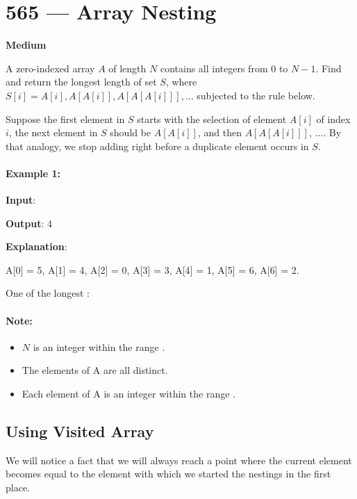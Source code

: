 \section{565 --- Array Nesting}

\textbf{Medium}

A zero-indexed array $A$ of length $N$ contains all integers from 0 to $N-1$. Find and return the longest length of set $S$, where $S[i] = {A[i], A[A[i]], A[A[A[i]]], \ldots }$ subjected to the rule below.

Suppose the first element in $S$ starts with the selection of element $A[i]$ of index $i$, the next element in $S$ should be $A[A[i]]$, and then $A[A[A[i]]]$, $\ldots$. By that analogy, we stop adding right before a duplicate element occurs in $S$.

 

\paragraph{Example 1:}

\begin{flushleft}
\textbf{Input}: 

\textbf{Output}: 4

\textbf{Explanation}: 

A[0] = 5, A[1] = 4, A[2] = 0, A[3] = 3, A[4] = 1, A[5] = 6, A[6] = 2.

One of the longest :

\end{flushleft}
 

\paragraph{Note:}

\begin{itemize}
\item $N$ is an integer within the range \fcj{[1, 20,000]}.

\item The elements of A are all distinct.

\item Each element of A is an integer within the range \fcj{[0, N-1]}.
\end{itemize}

\subsection{Using Visited Array}
We will notice a fact that we will always reach a point where the current element becomes equal to the element  with which we started the nestings in the first place. 


